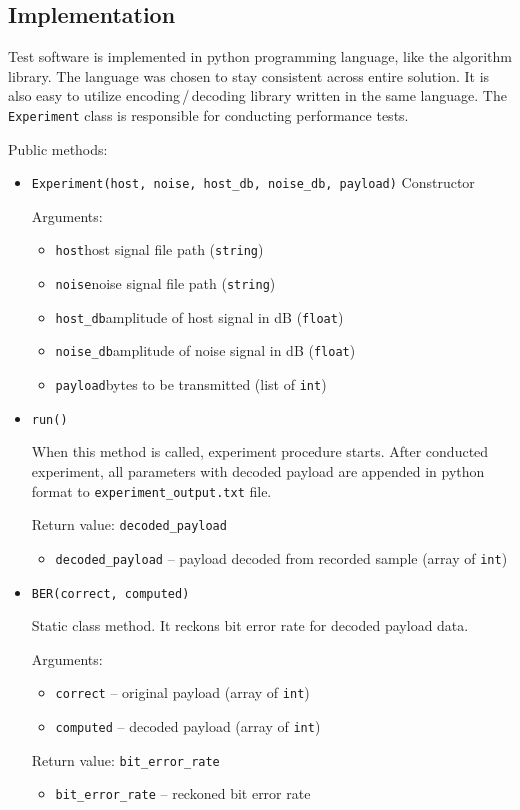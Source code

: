 \documentclass[english,bachelor,a4paper,oneside]{ppfcmthesis}
\begin{document}
\subsection{Implementation}

Test software is implemented in python programming language, like the algorithm library. The language was chosen to stay consistent across entire solution.
It is also easy to utilize encoding\,/\,decoding library written in the same language.
The \verb|Experiment| class is responsible for conducting performance tests.

Public methods:
\begin{itemize}
  \item \verb|Experiment(host, noise, host_db, noise_db, payload)|
    Constructor

    Arguments:
    \begin{itemize}
      \item \verb|host|\quad host signal file path (\verb|string|)
      \item \verb|noise|\quad noise signal file path (\verb|string|)
      \item \verb|host_db|\quad amplitude of host signal in \mbox{dB} (\verb|float|)
      \item \verb|noise_db|\quad amplitude of noise signal in \mbox{dB} (\verb|float|)
      \item \verb|payload|\quad bytes to be transmitted (list of \verb|int|)
    \end{itemize}

  \item \verb|run()|

    When this method is called, experiment procedure starts. After conducted experiment, all parameters with decoded payload are appended in python format to \verb|experiment_output.txt| file.

    Return value: \verb|decoded_payload|
    \begin{itemize}
    \item \verb|decoded_payload| – payload decoded from recorded sample (array of \verb|int|)
    \end{itemize}

  \item \verb|BER(correct, computed)|

    Static class method.
    It reckons bit error rate for decoded payload data.

    Arguments:
    \begin{itemize}
      \item \verb|correct| -- original payload (array of \verb|int|)
      \item \verb|computed| -- decoded payload (array of \verb|int|)
    \end{itemize}

    Return value: \verb|bit_error_rate|
    \begin{itemize}
      \item \verb|bit_error_rate| -- reckoned bit error rate
    \end{itemize}

\end{itemize}
\end{document}
